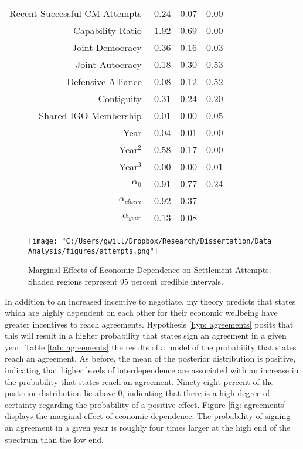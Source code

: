 \begin{table}[ht]
\begin{tabular}{rrrr}
Recent Successful CM Attempts & 0.24 & 0.07 & 0.00 \\ 

Capability Ratio & -1.92 & 0.69 & 0.00 \\ 

Joint Democracy & 0.36 & 0.16 & 0.03 \\ 

Joint Autocracy & 0.18 & 0.30 & 0.53 \\ 

Defensive Alliance & -0.08 & 0.12 & 0.52 \\ 

Contiguity & 0.31 & 0.24 & 0.20 \\ 

Shared IGO Membership & 0.01 & 0.00 & 0.05 \\ 

Year & -0.04 & 0.01 & 0.00 \\ 

Year$^2$ & 0.58 & 0.17 & 0.00 \\ 

Year$^3$ & -0.00 & 0.00 & 0.01 \\ 

$\alpha_0$ & -0.91 & 0.77 & 0.24 \\ 

$\alpha_{claim}$ & 0.92 & 0.37 &  \\ 

$\alpha_{year}$ & 0.13 & 0.08 &  \\ 

\bottomrule

\end{tabular}

\end{table}



\begin{figure}
	\caption{Marginal Effects of Economic Dependence on Settlement Attempts. Shaded regions represent 95 percent credible intervals.}
	\label{fig: attempts}
	\texttt{[image: "C:/Users/gwill/Dropbox/Research/Dissertation/Data Analysis/figures/attempts.png"]}
\end{figure}

In addition to an increased incentive to negotiate, my theory predicts that states which are highly dependent on each other for their economic wellbeing have greater incentives to reach agreements. Hypothesis \ref{hyp: agreements} posits that this will result in a higher probability that states sign an agreement in a given year. Table \ref{tab: agreements} the results of a model of the probability that states reach an agreement. As before, the mean of the posterior distribution is positive, indicating that higher levels of interdependence are associated with an increase in the probability that states reach an agreement. Ninety-eight percent of the posterior distribution lie above 0, indicating that there is a high degree of certainty regarding the probability of a positive effect. Figure \ref{fig: agreements} displays the marginal effect of economic dependence. The probability of signing an agreement in a given year is roughly four times larger at the high end of the spectrum than the low end.

